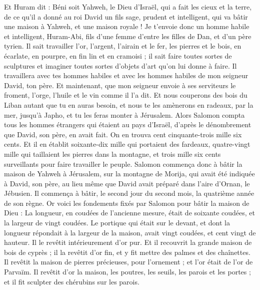 \begin{multicols}{2}
Et Huram dit : Béni soit Yahweh, le Dieu d'Israël, qui a fait les cieux et la terre, de ce qu'il a donné au roi David un fils sage, prudent et intelligent, qui va bâtir une maison à Yahweh, et une maison royale !
Je t'envoie donc un homme habile et intelligent, Huram-Abi,
fils d'une femme d'entre les filles de Dan, et d'un père tyrien. Il sait travailler l'or, l'argent, l'airain et le fer, les pierres et le bois, en écarlate, en pourpre, en fin lin et en cramoisi ; il sait faire toutes sortes de sculptures et imaginer toutes sortes d'objets d'art qu'on lui donne à faire. Il travaillera avec tes hommes habiles et avec les hommes habiles de mon seigneur David, ton père.
Et maintenant, que mon seigneur envoie à ses serviteurs le froment, l'orge, l'huile et le vin comme il l'a dit.
Et nous couperons des bois du Liban autant que tu en auras besoin, et nous te les amènerons en radeaux, par la mer, jusqu'à Japho, et tu les feras monter à Jérusalem.
Alors Salomon compta tous les hommes étrangers qui étaient au pays d'Israël, d'après le dénombrement que David, son père, en avait fait. On en trouva cent cinquante-trois mille six cents.
Et il en établit soixante-dix mille qui portaient des fardeaux, quatre-vingt mille qui taillaient les pierres dans la montagne, et trois mille six cents surveillants pour faire travailler le peuple.
\VerseOne{}Salomon commença donc à bâtir la maison de Yahweh à Jérusalem, sur la montagne de Morija, qui avait été indiquée à David, son père, au lieu même que David avait préparé dans l'aire d'Ornan, le Jébusien.
Il commença à bâtir, le second jour du second mois, la quatrième année de son règne.
Or voici les fondements fixés par Salomon pour bâtir la maison de Dieu : La longueur, en coudées de l'ancienne mesure, était de soixante coudées, et la largeur de vingt coudées.
Le portique qui était sur le devant, et dont la longueur répondait à la largeur de la maison, avait vingt coudées, et cent vingt de hauteur. Il le revêtit intérieurement d'or pur.
Et il recouvrit la grande maison de bois de cyprès ; il la revêtit d'or fin, et y fit mettre des palmes et des chaînettes.
Il revêtit la maison de pierres précieuses, pour l'ornement ; et l'or était de l'or de Parvaïm.
Il revêtit d'or la maison, les poutres, les seuils, les parois et les portes ; et il fit sculpter des chérubins sur les parois.

\end{multicols}

